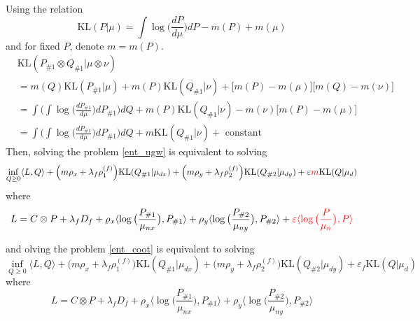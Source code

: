 \documentclass{article}
\theoremstyle{remark}
\begin{document}
Using the relation 
\begin{equation*}
    \text{KL}(P \vert \mu) = \int \log \big( \frac{dP}{d\mu}\big) dP - m(P) + m(\mu)
\end{equation*}
and for fixed $P$, denote $m = m(P)$.
\begin{equation*}
    \begin{split}
        &\text{KL}(P_{\# 1} \otimes Q_{\# 1} \vert \mu \otimes \nu) \\
        &= m(Q) \text{KL}(P_{\# 1} \vert \mu) + m(P) \text{KL}(Q_{\# 1} \vert \nu) + \big[m(P) - m(\mu)\big] \big[m(Q) - m(\nu)\big] \\
        &= \int \Big( \int \log \big(\frac{d P_{\# 1}}{d \mu} \big) dP_{\# 1} \Big) dQ + m(P) \text{KL}(Q_{\# 1} \vert \nu) -
        m(\nu)\big[m(P) - m(\mu)\big] \\
        &= \int \Big( \int \log \big(\frac{d P_{\# 1}}{d \mu} \big) dP_{\# 1} \Big) dQ + m \text{KL}(Q_{\# 1} \vert \nu) + \text{ constant}
    \end{split}
\end{equation*}
Then, solving the problem \ref{ent_ugw} is equivalent to solving
\begin{equation*}
    \inf_{Q \geq 0} \langle L, Q \rangle + \Big( m \rho_x + \lambda_f \rho_1^{(f)} \Big) \text{KL}(Q_{\# 1} \vert \mu_{dx}) + \Big( m \rho_y + \lambda_f \rho_2^{(f)} \Big) \text{KL}(Q_{\# 2} \vert \mu_{dy}) + \varepsilon {\color{red}{m}} \text{KL}(Q \vert \mu_d)
\end{equation*}
where
\begin{equation*}
    L = C \otimes P + \lambda_f D_f + \rho_x \langle \log \big(\frac{P_{\# 1}}{\mu_{nx}} \big), P_{\# 1} \rangle + \rho_y \langle \log \big(\frac{P_{\# 2}}{\mu_{ny}} \big), P_{\# 2} \rangle + \color{red}{\varepsilon \langle \log \big(\frac{P}{\mu_n} \big), P \rangle}
\end{equation*}

and olving the problem \ref{ent_coot} is equivalent to solving
\begin{equation*}
    \inf_{Q \geq 0} \langle L, Q \rangle + \Big( m \rho_x + \lambda_f \rho_1^{(f)} \Big) \text{KL}(Q_{\# 1} \vert \mu_{dx}) + \Big( m \rho_y + \lambda_f \rho_2^{(f)} \Big) \text{KL}(Q_{\# 2} \vert \mu_{dy})  + \varepsilon_f \text{KL}(Q \vert \mu_d)
\end{equation*}
where
\begin{equation*}
    L = C \otimes P + \lambda_f D_f + \rho_x \langle \log \big(\frac{P_{\# 1}}{\mu_{nx}} \big), P_{\# 1} \rangle + \rho_y \langle \log \big(\frac{P_{\# 2}}{\mu_{ny}} \big), P_{\# 2} \rangle
\end{equation*}
\end{document}
